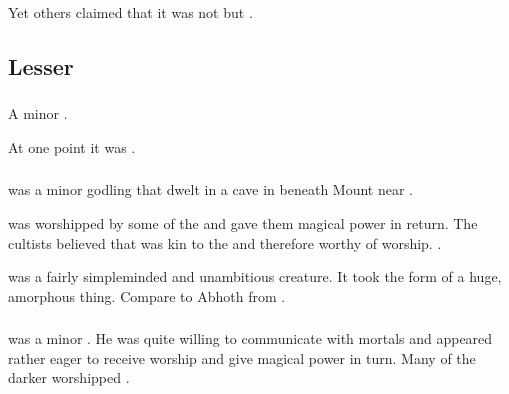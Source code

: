 Yet others claimed that it was not \RuinSatha but . 













\subsection{Lesser \XzaiShanns}





\subsubsection{\HothNrul}
\index{\HothNrul}
A minor \xs. 

At one point it was . 





\subsubsection{\Ubloth}
\index{\Ubloth}
\Ubloth was a minor \xs godling that dwelt in a cave in  beneath Mount  near . 

\Ubloth was worshipped by some of the  and gave them magical power in return. 
The \Ubloth cultists believed that \Ubloth was kin to the \Ortaican {} and therefore worthy of worship.
. 

\Ubloth was a fairly simpleminded and unambitious creature.
It took the form of a huge, amorphous thing. 
Compare to Abhoth from \cite{ClarkAshtonSmith:TheSevenGeases}.


% 


\subsubsection{\Yolbaoth}
\index{\Yolbaoth}
\Yolbaoth was a minor \xs. 
He was quite willing to communicate with mortals and appeared rather eager to receive worship and give magical power in turn. 
Many of the darker  worshipped \Yolbaoth. 


